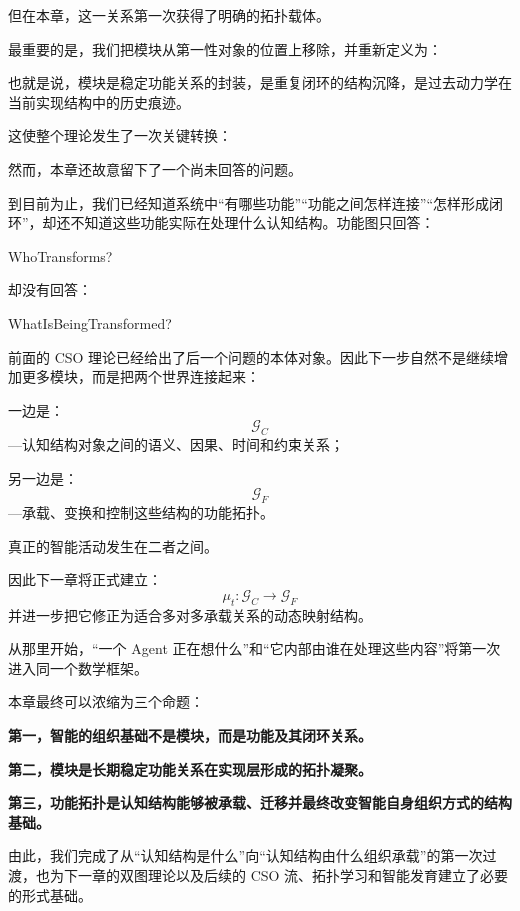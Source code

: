 但在本章，这一关系第一次获得了明确的拓扑载体。

最重要的是，我们把模块从第一性对象的位置上移除，并重新定义为：
\begin{statementbox}
\centering
{}
\end{statementbox}

也就是说，模块是稳定功能关系的封装，是重复闭环的结构沉降，是过去动力学在当前实现结构中的历史痕迹。

这使整个理论发生了一次关键转换：
\begin{statementbox}
\centering
{}
\end{statementbox}

然而，本章还故意留下了一个尚未回答的问题。

到目前为止，我们已经知道系统中“有哪些功能”“功能之间怎样连接”“怎样形成闭环”，却还不知道这些功能实际在处理什么认知结构。功能图只回答：
\begin{statementbox}
WhoTransforms?
\end{statementbox}
却没有回答：
\begin{statementbox}
WhatIsBeingTransformed?
\end{statementbox}

前面的 CSO 理论已经给出了后一个问题的本体对象。因此下一步自然不是继续增加更多模块，而是把两个世界连接起来：

一边是：
\[
\mathcal G_C
\]
---认知结构对象之间的语义、因果、时间和约束关系；

另一边是：
\[
\mathcal G_F
\]
---承载、变换和控制这些结构的功能拓扑。

真正的智能活动发生在二者之间。

因此下一章将正式建立：
\[
\boxed{
\mu_t:
\mathcal G_C
\longrightarrow
\mathcal G_F
}
\]
并进一步把它修正为适合多对多承载关系的动态映射结构。

从那里开始，“一个 Agent 正在想什么”和“它内部由谁在处理这些内容”将第一次进入同一个数学框架。

本章最终可以浓缩为三个命题：

\begin{proposition*}
\bfseries 第一，智能的组织基础不是模块，而是功能及其闭环关系。
\end{proposition*}

\begin{statementbox}
\bfseries 第二，模块是长期稳定功能关系在实现层形成的拓扑凝聚。
\end{statementbox}

\begin{statementbox}
\bfseries 第三，功能拓扑是认知结构能够被承载、迁移并最终改变智能自身组织方式的结构基础。
\end{statementbox}

由此，我们完成了从“认知结构是什么”向“认知结构由什么组织承载”的第一次过渡，也为下一章的双图理论以及后续的 CSO 流、拓扑学习和智能发育建立了必要的形式基础。
